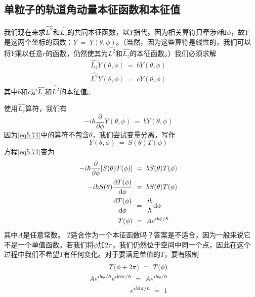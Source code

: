 \documentclass[12pt,a4paper,openany]{ctexbook}
\newcommand{\dd}[1]{\mathrm{d} #1}
\begin{document}
\subsection{单粒子的轨道角动量本征函数和本征值}
\begin{flushleft}
    \setlength{\parindent}{2em}
我们现在来求$\hat{L^2}$和$\hat{L_z}$的共同本征函数，以$Y$指代。因为相关算符只牵涉$\theta$和$\phi$，故$Y$是这两个坐标的函数：$Y\ =\ Y(\theta,\phi)$。（当然，因为这些算符是线性的，我们可以将$Y$乘以任意$r$的函数，仍然使其为$\hat{L^2}$和$\hat{L_z}$的本征函数。）我们必须求解
\begin{gather}
    \hat{L_z}Y(\theta,\phi)\ =\ bY(\theta,\phi) \label{eq5.69} \\
    \hat{L^2}Y(\theta,\phi)\ =\ cY(\theta,\phi) \label{eq5.70}
\end{gather}
其中$b$和$c$是$\hat{L_z}$和$\hat{L^2}$的本征值。

使用$\hat{L_z}$算符，我们有
\begin{equation}
    -i\hbar\frac{\partial}{\partial\phi}Y(\theta,\phi)\ =\ bY(\theta,\phi) \label{eq5.71}
\end{equation}
因为\eqref{eq5.71}中的算符不包含$\theta$，我们尝试变量分离，写作
\begin{equation}
    Y(\theta,\phi)\ =\ S(\theta)T(\phi) \label{eq5.72}
\end{equation}
方程\eqref{eq5.71}变为
\begin{align}
    -i\hbar\frac{\partial}{\partial\phi}[S(\theta)T(\phi)]\ &=\ bS(\theta)T(\phi) \notag \\
    -i\hbar S(\theta)\frac{\dd T(\phi)}{\dd\phi}\ &=\ bS(\theta)T(\phi) \notag \\
    \frac{\dd T(\phi)}{\dd\phi}\ &=\ \frac{ib}{\hbar}\dd\phi \notag \\
    T(\phi)\ &=\ Ae^{ib\phi/\hbar} \label{eq5.73}
\end{align}
其中$A$是任意常数。
$T$适合作为一个本征函数吗？答案是不适合，因为一般来说它不是一个单值函数。若我们将$\phi$加$2\pi$，我们仍然位于空间中同一个点，因此在这个过程中我们不希望$T$有任何变化。对于要满足单值的$T$，要有限制
\begin{align}
    T(\phi+2\pi)\ =\ T(\phi) \notag \\
    Ae^{ib\phi/\hbar}e^{ib2\pi/\hbar}\ =\ Ae^{ib\phi/\hbar} \notag \\
    e^{ib2\pi/\hbar}\ =\ 1 \label{eq5.74}
\end{align}


\end{flushleft}
\end{document}
